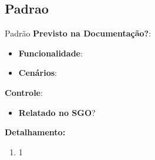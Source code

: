 \subsection{Padrao}
\begin{falha}[0]{Padrão}
	\textbf{Previsto na Documentação?}: \mscheckint
	\begin{itemize}
		\item \textbf{Funcionalidade}:
		\item \textbf{Cenários}:
	\end{itemize}
	
	\textbf{Controle}:
	\begin{itemize}
		\item \textbf{Relatado no SGO}? \mschecknao %
	\end{itemize}
	
	\tcblower
	
	\textbf{Detalhamento:}
	\begin{enumerate}
		\item 1
	\end{enumerate}
	
\end{falha}


